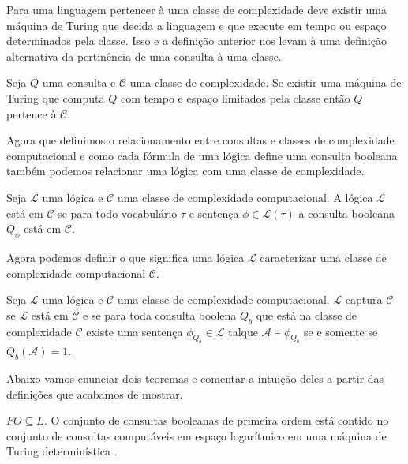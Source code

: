 Para uma linguagem pertencer à uma classe de complexidade deve existir uma máquina de Turing que decida a linguagem e que execute em tempo ou espaço determinados pela classe. Isso e a definição anterior nos levam à uma definição alternativa da pertinência de uma consulta à uma classe. 

\begin{defi}
Seja $Q$ uma consulta e $\mathcal{C}$ uma classe de complexidade. Se existir uma máquina de Turing que computa $Q$ com tempo e espaço limitados pela classe então $Q$ pertence à $\mathcal{C}$.
\end{defi}

Agora que definimos o relacionamento entre consultas e classes de complexidade computacional e como cada fórmula de uma lógica define uma consulta booleana também podemos relacionar uma lógica com uma classe de complexidade.

\begin{defi}
 Seja $\mathcal{L}$ uma lógica e $\mathcal{C}$ uma classe de complexidade computacional. A lógica $\mathcal{L}$ está em $\mathcal{C}$ se para todo vocabulário $\tau$ e sentença $\phi \in \mathcal{L}(\tau)$ a consulta booleana $Q_{\phi}$ está em $\mathcal{C}$.
\end{defi}
 
Agora podemos definir o que significa uma lógica $\mathcal{L}$ caracterizar uma classe de complexidade computacional $\mathcal{C}$.

\begin{defi}
Seja $\mathcal{L}$ uma lógica e $\mathcal{C}$ uma classe de complexidade computacional. $\mathcal{L}$ captura $\mathcal{C}$ se $\mathcal{L}$  está em $\mathcal{C}$ e se para toda consulta boolena $Q_b$ que está na classe de complexidade $\mathcal{C}$ existe uma sentença $\phi_{Q_b} \in \mathcal{L}$ talque $\mathcal{A} \models \phi_{Q_b}$ se e somente se $Q_b(\mathcal{A}) = 1$.
\end{defi}

Abaixo vamos enunciar dois teoremas e comentar a intuição deles a partir das definições que acabamos de mostrar.

\begin{teo}
$FO \subseteq L$. O conjunto de consultas booleanas de primeira ordem está contido no conjunto de consultas computáveis em espaço logarítmico em uma máquina de Turing determinística \cite{immerman99}.
\end{teo}

